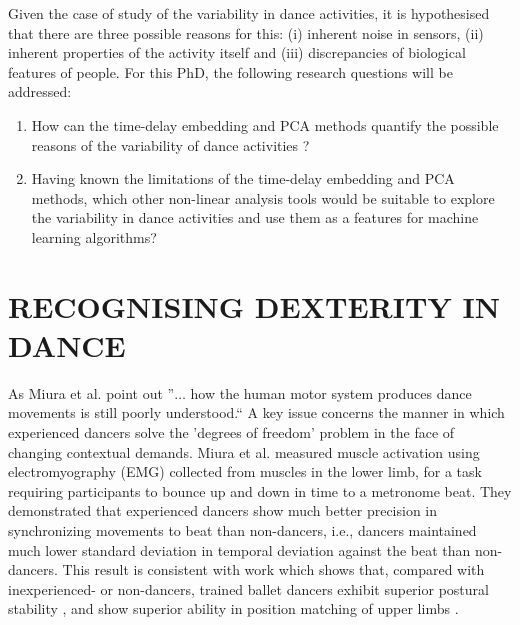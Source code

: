 \documentclass[10pt,journal,compsoc]{IEEEtran}
\begin{document}
Given the case of study of the variability in dance activities, it is hypothesised that 
there are three possible reasons for this:
(i) inherent noise in sensors, 
(ii) inherent properties of the activity itself and
(iii) discrepancies of biological features of people.
For this PhD, the following research questions will be addressed:
\begin{enumerate}
 \item How can the time-delay embedding and PCA methods quantify the possible reasons of 
 the variability of dance activities ?
 \item Having known the limitations of the time-delay embedding and PCA methods,
 which other non-linear analysis tools would be suitable to explore the variability in dance
	activities and use them as a features for machine learning algorithms?
\end{enumerate}






% 
% 



\section{RECOGNISING DEXTERITY IN DANCE }
As Miura et al. \cite{Miura2015} point out ''$\ldots$ how the human motor system produces 
dance movements is still poorly understood.`` A key issue concerns the manner in which experienced 
dancers solve the 'degrees of freedom' problem in the face of changing contextual demands.  
Miura et al. \cite{Miura2013} measured muscle activation using electromyography (EMG) collected 
from muscles in the lower limb, for a task requiring participants to 
bounce up and down in time to a metronome beat.  
They demonstrated that experienced dancers show much better precision in synchronizing 
movements to beat than non-dancers, i.e., dancers maintained much lower standard 
deviation in temporal deviation against the beat than non-dancers. 
This result is consistent with work which shows that, compared with inexperienced- or 
non-dancers, trained ballet dancers exhibit superior postural 
stability \cite{Crotts1996}, and show superior ability in position matching 
of upper limbs \cite{Ramsay2001}.
\end{document}
